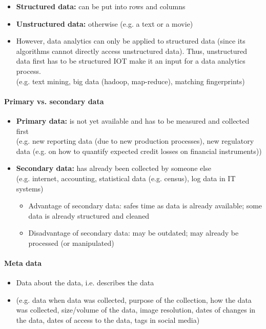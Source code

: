\documentclass[a4paper, landscape, 6pt, fleqn]{scrartcl}
\renewcommand{\emph}[1]{\textbf{#1}}
\begin{document}
\begin{multicols*}{4}
\begin{itemize}
\item \emph{Structured data:} can be put into rows and columns
\item \emph{Unstructured data:} otherwise (e.g. a text or a movie)
\item However, data analytics can only be applied to structured data (since its algorithms cannot directly access unstructured data). Thus, unstructured data first has to be structured IOT make it an input for a data analytics process. \\
(e.g. text mining, big data (hadoop, map-reduce), matching fingerprints)
\end{itemize}

\paragraph{Primary vs. secondary data}

\begin{itemize}
\item \emph{Primary data:} is not yet available and has to be measured and collected first \\
(e.g. new reporting data (due to new production processes), new regulatory data (e.g. on how to quantify expected credit losses on financial instruments))
\item \emph{Secondary data:} has already been collected by someone else \\
(e.g. internet, accounting, statistical data (e.g. census), log data in IT systems)
\begin{itemize}
\item Advantage of secondary data: safes time as data is already available; some data is already structured and cleaned
\item Disadvantage of secondary data: may be outdated; may already be processed (or manipulated)
\end{itemize}
\end{itemize}

\paragraph{Meta data}

\begin{itemize}
\item Data about the data, i.e. describes the data
\item (e.g. data when data was collected, purpose of the collection, how the data was collected, size/volume of the data, image resolution, dates of changes in the data, dates of access to the data, tags in social media)
\end{itemize}


\end{multicols*}
\end{document}
